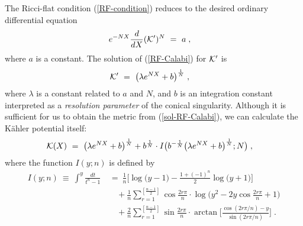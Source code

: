 \documentclass[a4paper,11pt]{article}
\newcommand{\ltd}[1]{\frac{d}{d{#1}}}
\newcommand{\kahler}{K\"{a}hler }
\begin{document}
{The Ricci-flat condition (\ref{RF-condition})  
reduces to the desired ordinary differential equation 
\begin{align}
e^{- N X} \ltd{X} ({\cal K}')^N \ &= \ a \; , \label{RF-Calabi}
\end{align}
where $a$ is a constant. 
The solution of (\ref{RF-Calabi}) for ${\cal K}'$ is 
\begin{align}
{\cal K}' \ &= \ \big( \lambda e^{N X} + b \big)^{\frac{1}{N}} \; ,
\label{sol-RF-Calabi}
\end{align}
where $\lambda$ is a constant related to $a$ and $N$, and 
$b$ is an integration constant interpreted as a {\it resolution
parameter} of the conical singularity.
Although it is sufficient for us to obtain the metric from
(\ref{sol-RF-Calabi}), 
we can calculate the \kahler potential itself:
\begin{align}
{\cal K} (X) 
\ &= \ 
\big( \lambda e^{NX} + b \big)^{\frac{1}{N}} 
+ b^{\frac{1}{N}} 
\cdot I \big( b^{- \frac{1}{N}} 
\big( \lambda e^{N X} + b \big)^{\frac{1}{N}} ; N \big) \; , 
\label{kahler-Calabi}
\end{align}
where the function $I(y;n)$ is defined by
\begin{align}
I (y; n) 
\ \equiv \ 
  \int^{y} \! \frac{dt}{t^n - 1} 
\ &= \ \frac{1}{n} \Big[ \log \big( y - 1 \big) 
    - \frac{1 + (-1)^n}{2} 
    \log \big( y + 1 \big) \Big] \nonumber \\
& \ \ \ \ 
 + \frac{1}{n} \sum_{r=1}^{[\frac{n-1}{2}]} \cos \frac{2 r \pi}{n} 
\cdot \log \Big( y{}^2 - 2 y \cos \frac{2 r \pi}{n} + 1 \Big) 
\nonumber \\
\ & \ \ \ \ + \frac{2}{n} \sum_{r=1}^{[\frac{n-1}{2}]} 
\sin \frac{2 r \pi}{n} 
\cdot \arctan \Big[ \frac{\cos (2 r \pi / n) - y}
                    {\sin (2 r \pi /n) } \Big] \; . \label{fn-I}
\end{align}

}
\end{document}
